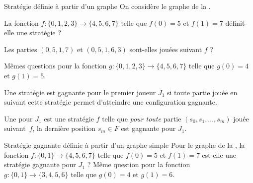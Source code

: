 \documentclass[12pt,fancy]{cours}
\begin{document}
\begin{exemple}{Stratégie définie à partir d'un graphe}
On considère le graphe de la .
\begin{quest}
  \item	La fonction $f : \{0,1,2,3\} \rightarrow \{4,5,6,7\}$ telle que $f(0)=5$ et $f(1)=7$ définit-elle une stratégie ?
  \item Les parties $(0,5,1,7)$ et $(0,5,1,6,3)$ sont-elles jouées suivant $f$ ?
  \item Mêmes questions pour la fonction $g : \{0,1,2,3\} \rightarrow \{4,5,6,7\}$ telle que $g(0)=4$ et $g(1)=5$.
\end{quest}
\end{exemple}


 Une stratégie est gagnante pour le premier joueur $J_1$ si toute partie jouée en suivant cette stratégie permet d'atteindre une configuration gagnante.
\begin{definition}
Une  pour $J_1$ est une stratégie $f$ telle que \emph{pour toute} partie $(s_0,s_1,...,s_m)$ jouée suivant~$f$, la dernière position $s_m \in F$ est gagnante pour $J_1$.
\end{definition}

\begin{exemple}{Stratégie gagnante définie à partir d'un graphe simple}
Pour le graphe de la , la fonction $f : \{0,1\} \rightarrow \{4,5,6,7\}$ telle que $f(0)=5$ et $f(1)=7$ est-elle une stratégie gagnante pour $J_1$ ? Même question pour la fonction $g : \{0,1\} \rightarrow \{3,4,5,6\}$ telle que $g(0)=4$ et $g(1)=6$.
\end{exemple}
\end{document}
